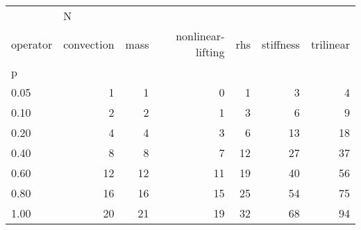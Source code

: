 \begin{tabular}{lrrrrrr}
\toprule
{} & \multicolumn{6}{l}{N} \\
operator & convection & mass & nonlinear-lifting & rhs & stiffness & trilinear \\
p    &            &      &                   &     &           &           \\
\midrule
0.05 &          1 &    1 &                 0 &   1 &         3 &         4 \\
0.10 &          2 &    2 &                 1 &   3 &         6 &         9 \\
0.20 &          4 &    4 &                 3 &   6 &        13 &        18 \\
0.40 &          8 &    8 &                 7 &  12 &        27 &        37 \\
0.60 &         12 &   12 &                11 &  19 &        40 &        56 \\
0.80 &         16 &   16 &                15 &  25 &        54 &        75 \\
1.00 &         20 &   21 &                19 &  32 &        68 &        94 \\
\bottomrule
\end{tabular}
